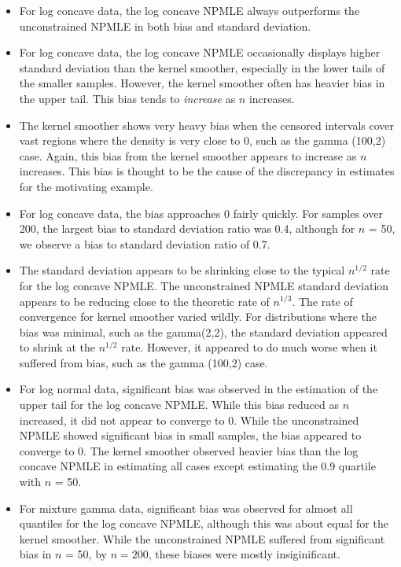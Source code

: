 \documentclass[10pt]{article}
\begin{document}
\begin{itemize}	
		
	\item For log concave data, the log concave NPMLE always outperforms the unconstrained NPMLE in both bias and standard deviation.
			
	\item For log concave data, the log concave NPMLE occasionally displays higher standard deviation than the kernel smoother, especially in the lower tails of the smaller samples. However, the kernel smoother often has heavier bias in the upper tail. This bias tends to \emph{increase} as $n$ increases.
	
	\item The kernel smoother shows very heavy bias when the censored intervals cover vast regions where the density is very close to 0, such as the gamma (100,2) case. Again, this bias from the kernel smoother appears to increase as $n$ increases. This bias is thought to be the cause of the discrepancy in estimates for the motivating example. 
	
	\item For log concave data, the bias approaches 0 fairly quickly. For samples over 200, the largest bias to standard deviation ratio was 0.4, although for $n$ = 50, we observe a bias to standard deviation ratio of 0.7. 
	
	\item The standard deviation appears to be shrinking close to the typical $n^{1/2}$ rate for the log concave NPMLE. The unconstrained NPMLE standard deviation appears to be reducing close to the theoretic rate of $n^{1/3}$. The rate of convergence for kernel smoother varied wildly. For distributions where the bias was minimal, such as the gamma(2,2), the standard deviation appeared to shrink at the $n^{1/2}$ rate. However, it appeared to do much worse when it suffered from bias, such as the gamma (100,2) case.

	\item For log normal data, significant bias was observed in the estimation of the upper tail for the log concave NPMLE. While this bias reduced as $n$ increased, it did not appear to converge to 0. While the unconstrained NPMLE showed significant bias in small samples, the bias appeared to converge to 0. The kernel smoother observed heavier bias than the log concave NPMLE in estimating all cases except estimating the 0.9 quartile with $n$ = 50. 
		
	\item For mixture gamma data, significant bias was observed for almost all quantiles for the log concave NPMLE, although this was about equal for the kernel smoother. While the unconstrained NPMLE suffered from significant bias in $n$ = 50, by $n = 200$, these biases were mostly insiginificant.
		

\end{itemize}
\end{document}
